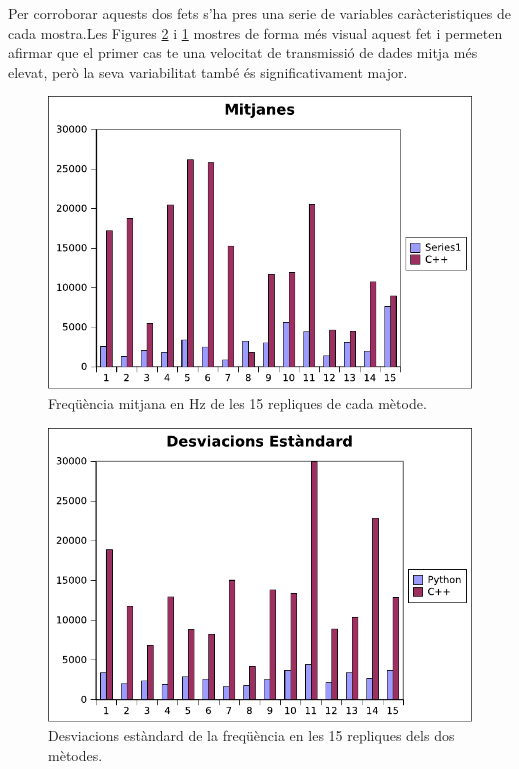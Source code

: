 \documentclass[12pt,a4paper,final,twoside]{article}
\begin{document}
Per corroborar aquests dos fets s'ha pres una serie de variables caràcteristiques de cada mostra.Les Figures \ref{fig:DevOneLeg} i \ref{fig:MitOneLeg} mostres de forma més visual aquest fet i permeten afirmar que el primer cas  te una velocitat de transmissió de dades mitja més elevat, però la seva variabilitat també és significativament major.

\begin{figure}[h!]
	\centering
    \includegraphics[scale=1]{images/mitjanesOneLeg.pdf}
	 \caption{Freqüència mitjana en Hz de les 15 repliques de cada mètode.}
  \label{fig:MitOneLeg}
\end{figure}
\begin{figure}[h!]
	\centering
    \includegraphics[scale=1]{images/DevOneLeg.pdf}
	 \caption{Desviacions estàndard de la freqüència en les 15 repliques dels dos mètodes.}
  \label{fig:DevOneLeg}
\end{figure}
\end{document}
